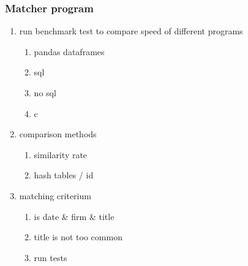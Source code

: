 \documentclass[11pt]{article}
\begin{document}
\subsubsection{Matcher program}
\label{sec:org8410ffa}
\begin{enumerate}
\item run benchmark test to compare speed of different programs
\label{sec:orgfa36313}
\begin{enumerate}
\item pandas dataframes
\label{sec:org44df735}
\item sql
\label{sec:orga36ebab}
\item no sql
\label{sec:orgd8c347e}
\item c
\label{sec:org7bd0a95}
\end{enumerate}
\item comparison methods
\label{sec:orgbc3dc1b}
\begin{enumerate}
\item similarity rate
\label{sec:orgcc88918}
\item hash tables / id
\label{sec:org0feba07}
\end{enumerate}
\item matching criterium
\label{sec:orgb5a2b70}
\begin{enumerate}
\item is date \& firm \& title
\label{sec:org0a0ee50}
\item title is not too common
\label{sec:org7929cdd}
\item run tests
\label{sec:orgef10e42}
\end{enumerate}
\end{enumerate}
\end{document}
